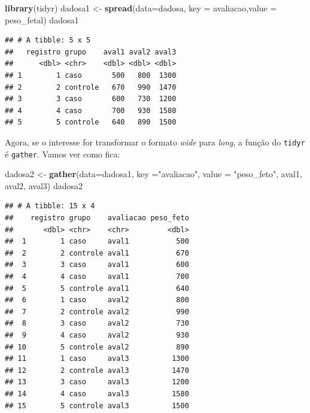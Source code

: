 \documentclass[
]{book}
\newenvironment{Shaded}{\begin{snugshade}}{\end{snugshade}}
\newcommand{\DataTypeTok}[1]{\textcolor[rgb]{0.13,0.29,0.53}{#1}}
\newcommand{\KeywordTok}[1]{\textcolor[rgb]{0.13,0.29,0.53}{\textbf{#1}}}
\newcommand{\NormalTok}[1]{#1}
\newcommand{\StringTok}[1]{\textcolor[rgb]{0.31,0.60,0.02}{#1}}
\begin{document}
\begin{Shaded}
\begin{Highlighting}[]
\KeywordTok{library}\NormalTok{(tidyr)}
\NormalTok{dadosa1 <-}\StringTok{ }\KeywordTok{spread}\NormalTok{(}\DataTypeTok{data=}\NormalTok{dadosa, }\DataTypeTok{key =}\NormalTok{ avaliacao,}\DataTypeTok{value =}\NormalTok{ peso_fetal)}
\NormalTok{dadosa1}
\end{Highlighting}
\end{Shaded}

\begin{verbatim}
## # A tibble: 5 x 5
##   registro grupo    aval1 aval2 aval3
##      <dbl> <chr>    <dbl> <dbl> <dbl>
## 1        1 caso       500   800  1300
## 2        2 controle   670   990  1470
## 3        3 caso       600   730  1200
## 4        4 caso       700   930  1580
## 5        5 controle   640   890  1500
\end{verbatim}

Agora, se o interesse for transformar o formato \emph{wide} para \emph{long}, a função do \texttt{tidyr} é \texttt{gather}. Vamos ver como fica:

\begin{Shaded}
\begin{Highlighting}[]
\NormalTok{dadosa2 <-}\StringTok{  }\KeywordTok{gather}\NormalTok{(}\DataTypeTok{data=}\NormalTok{dadosa1, }\DataTypeTok{key =}\StringTok{"avaliacao"}\NormalTok{, }\DataTypeTok{value =} \StringTok{"peso_feto"}\NormalTok{, aval1, aval2, aval3)}
\NormalTok{dadosa2}
\end{Highlighting}
\end{Shaded}

\begin{verbatim}
## # A tibble: 15 x 4
##    registro grupo    avaliacao peso_feto
##       <dbl> <chr>    <chr>         <dbl>
##  1        1 caso     aval1           500
##  2        2 controle aval1           670
##  3        3 caso     aval1           600
##  4        4 caso     aval1           700
##  5        5 controle aval1           640
##  6        1 caso     aval2           800
##  7        2 controle aval2           990
##  8        3 caso     aval2           730
##  9        4 caso     aval2           930
## 10        5 controle aval2           890
## 11        1 caso     aval3          1300
## 12        2 controle aval3          1470
## 13        3 caso     aval3          1200
## 14        4 caso     aval3          1580
## 15        5 controle aval3          1500
\end{verbatim}
\end{document}
